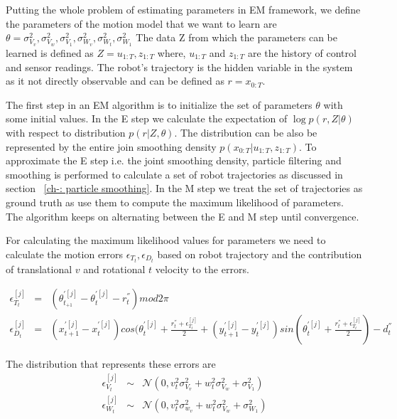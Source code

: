 \documentclass[12pt]{dalcsthesis}
\begin{document}
Putting the whole problem of estimating parameters in EM framework, we define the parameters of the motion model that we want to learn are
$\theta={\sigma_{V_{v}}^{2},\sigma_{V_{w}}^{2},\sigma_{V_{1}}^{2},\sigma_{W_{v}}^{2},\sigma_{W_{t}}^{2},\sigma_{W_{1}}^{2}}$
The data Z from which the parameters can be learned is defined as $Z={u_{1:T},z_{1:T}}$
where, $u_{1:T}$ and $z_{1:T}$ are the history of control and sensor readings. The robot's trajectory is the hidden variable in the system as it not directly observable and can be defined as $r=x_{0:T}$.

The first step in an EM algorithm is to initialize the set of parameters $\theta$ with some initial values. In the E step we calculate the expectation of $\log p(r,Z|\theta)$ with respect to distribution $p(r|Z,\theta)$. The distribution can be also be represented by the entire join smoothing density $p(x_{0:T}|u_{1:T},z_{1:T})$. To approximate the E step i.e. the joint smoothing density, particle filtering and smoothing is performed to calculate a set of robot trajectories as discussed in section ~\ref{ch-: particle smoothing}. In the M step we treat the set of trajectories as ground truth as use them to compute the maximum likelihood of parameters. The algorithm keeps on alternating between the E and M step until convergence. 

For calculating the maximum likelihood values for parameters we need to calculate the motion errors $\epsilon_{T_{t}},\epsilon_{D_{t}}$ based on robot trajectory and the contribution of translational $v$ and rotational $t$ velocity to the errors.

\begin{eqnarray}
\epsilon_{T_{t}}^{[j]}&=&(\theta_{t_{+1}}^{'[j]}-\theta_{t}^{'[j]}-r_{t}^{''})mod2\pi\\
\epsilon_{D_{t}}^{[j]}&=&(x_{t+1}^{'[j]}-x_{t}^{'[j]})cos(\theta_{t}^{'[j]}+\frac{r_{t}^{''}+\epsilon_{T_{t}}^{[j]}}{2}+(y_{t+1}^{'[j]}-y_{t}^{'[j]})sin(\theta_{t}^{'[j]}+\frac{r_{t}^{''}+\epsilon_{T_{t}}^{[j]}}{2})-d_{t}^{''}
\end{eqnarray}

The distribution that represents these errors are 
\begin{eqnarray}
\epsilon_{V_{t}}^{[j]}&\sim&\mathcal{{N}}(0,v_{t}^{2}\sigma_{V_{v}}^{2}+w_{t}^{2}\sigma_{V_{w}}^{2}+\sigma_{V_{1}}^{2})\\
\epsilon_{W_{t}}^{[j]}&\sim&\mathcal{{N}}(0,v_{t}^{2}\sigma_{w_{v}}^{2}+w_{t}^{2}\sigma_{V_{w}}^{2}+\sigma_{W_{1}}^{2})
\end{eqnarray}
\end{document}
